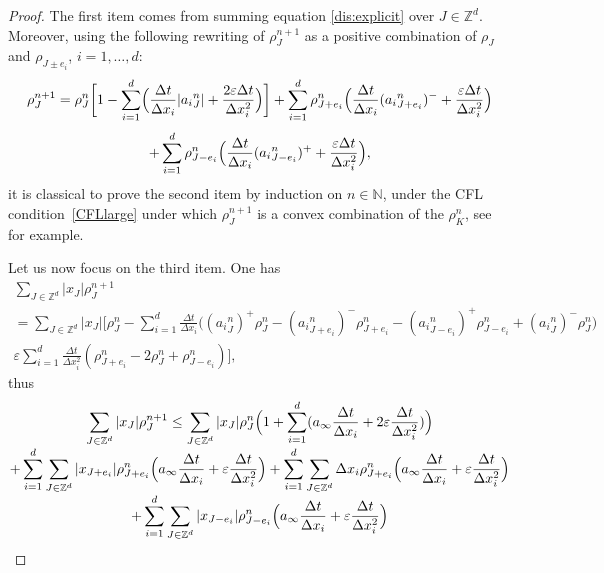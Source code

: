 \documentclass[JEP,XML,SOM,Unicode, NoFloatCountersInSection,published]{cedram}
\def\NN{\mathbb{N}}
\def\ZZ{\mathbb{Z}}
\def\eps{\varepsilon}
\def\dt{\Delta t}
\def\dx{\Delta x}
\theoremstyle{plain}
\theoremstyle{definition}
\begin{document}
\begin{proof}
The first item comes from summing equation \eqref{dis:explicit} over $J \in \ZZ^d$. Moreover, using the following rewriting of $\rho_{J}^{n+1}$ as a positive combination of $\rho_J$ and $\rho_{J\pm e_i}$, $i=1,\ldots,d$:\vspace*{-3pt}
\begin{multline*}
\rho_{J}^{n+1} = \rho_{J}^n \biggl[ 1 - \sum_{i=1}^d \Bigl(\frac{\dt}{\dx_i} |{a_i}^n_{J}| + \frac{2\eps\dt}{\dx_i^2}\Bigr) \biggr]
+ \sum_{i=1}^d \rho_{J+e_i}^n \Bigl(\frac{\dt}{\dx_i}({a_i}^n_{J+e_i})^- + \frac{\eps\dt}{\dx_i^2}\Bigr)\notag\\[-5pt] \\[-8pt]
+ \sum_{i=1}^d \rho_{J-e_i}^n \Bigl(\frac{\dt}{\dx_i}({a_i}^n_{J-e_i})^+ + \frac{\eps\dt}{\dx_i^2}\Bigr), \notag
\end{multline*}
it is classical to prove the second item by induction on $n \in \NN$, under the CFL condition~\eqref{CFLlarge} under which $\rho_J^{n+1}$ is a convex combination of the $\rho_K^n$, see \cite{leveque} for example.
\item Let us now focus on the third item. One has\vspace*{-5pt}
\begin{multline*}
\sum_{J\in \ZZ^d} |x_J|\rho_{J}^{n+1} \\[-3pt]
=
\sum_{J\in \ZZ^d} |x_J|\biggl[ \rho_{J}^n- \sum_{i=1}^{d} \frac{\dt}{\dx_i}
\Big(({a_i}^n_{J})^+ \rho_{J}^n - ({a_i}^n_{J+e_i})^- \rho_{J+e_i}^n
-({a_i}^n_{J-e_i})^+ \rho_{J-e_i}^n + ({a_i}^n_{J})^- \rho_{J}^n \Big) \\[-3pt]
\eps \sum_{i=1}^{d} \frac{\dt}{\dx_i^2} \left(\rho_{J+e_i}^n - 2\rho_J^n + \rho_{J-e_i}^n \right)\biggr],
\end{multline*}
thus\vspace*{-5pt}
\begin{multline*}
\sum_{J\in \ZZ^d} |x_J|\rho_{J}^{n+1} \leq \sum_{J\in \ZZ^d} |x_J|\rho_{J}^{n}
\Bigl( 1 + \sum_{i = 1}^d (a_\infty \frac{\Delta t}{\Delta x_i} + 2 \eps \frac{\Delta t}{\Delta x_i^2})\Bigr) \\[-3pt]
+ \sum_{i = 1}^d \sum_{J\in \ZZ^d} |x_{J+e_i}|\rho_{J + e_i}^{n} \Bigl(a_\infty \frac{\Delta t}{\Delta x_i} + \eps \frac{\Delta t}{\Delta x_i^2}\Bigr)
+ \sum_{i = 1}^d \sum_{J\in \ZZ^d} \Delta x_i\rho_{J + e_i}^{n} \Bigl(a_\infty \frac{\Delta t}{\Delta x_i} + \eps \frac{\Delta t}{\Delta x_i^2}\Bigr) \\[-3pt]
+ \sum_{i = 1}^d \sum_{J\in \ZZ^d} |x_{J-e_i}|\rho_{J - e_i}^{n} \Bigl(a_\infty \frac{\Delta t}{\Delta x_i} + \eps \frac{\Delta t}{\Delta x_i^2}\Bigr)

\end{multline*}
\end{proof}
\end{document}
